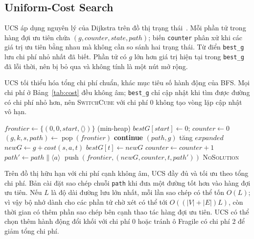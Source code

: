 \subsection{Uniform-Cost Search}

UCS áp dụng nguyên lý của Dijkstra trên đồ thị trạng thái~\cite{dijkstra1959}.
Mỗi phần tử trong hàng đợi ưu tiên chứa $(g,counter,state,path)$; biến
\texttt{counter} phân xử khi các giá trị ưu tiên bằng nhau mà không cần so sánh
hai trạng thái. Từ điển \texttt{best\_g} lưu chi phí nhỏ nhất đã biết. Phần
tử có $g$ lớn hơn giá trị hiện tại trong \texttt{best\_g} đã lỗi thời, nên bị
bỏ qua và không tính là một nút mở rộng.

UCS tối thiểu hóa tổng chi phí chuẩn, khác mục tiêu số hành động của BFS. Mọi chi phí ở
Bảng~\ref{tab:cost} đều không âm; \texttt{best\_g} chỉ cập nhật khi tìm được
đường có chi phí nhỏ hơn, nên \textsc{SwitchCube} với chi phí 0 không tạo vòng
lặp cập nhật vô hạn.

\begin{algorithm}[H]
\caption{Uniform-Cost Search}
\label{alg:ucs}
\begin{algorithmic}[1]
\State $\mathit{frontier}\gets\{(0,0,start,\langle\rangle)\}$ (min-heap)
\State $\mathit{bestG}[start]\gets0$; $\mathit{counter}\gets0$
    \State $(g,k,s,\mathit{path})\gets\operatorname{pop}(\mathit{frontier})$
     \State \textbf{continue} \EndIf
     \State \Return $(\mathit{path},g)$ \EndIf
    \State tăng $expanded$
        \State $\mathit{newG}\gets g+cost(s,a,t)$
            \State $\mathit{bestG}[t]\gets\mathit{newG}$
            \State $\mathit{counter}\gets\mathit{counter}+1$
            \State $\mathit{path}'\gets\mathit{path}\mathbin{\|}\langle a\rangle$
            \State $\operatorname{push}(\mathit{frontier},(\mathit{newG},\mathit{counter},t,\mathit{path}'))$
        \EndIf
    \EndFor
\EndWhile
\State \Return \textsc{NoSolution}
\EndFunction
\end{algorithmic}
\end{algorithm}

Trên đồ thị hữu hạn với chi phí cạnh không âm, UCS đầy đủ và tối ưu theo tổng
chi phí. Bản cài đặt sao chép chuỗi \texttt{path} khi đưa một đường tốt hơn
vào hàng đợi ưu tiên. Nếu $L$ là độ dài đường lưu lớn nhất, mỗi lần sao chép
có thể tốn $O(L)$; vì vậy bộ nhớ dành cho các phần tử chờ xét có thể tới
$O((|V|+|E|)L)$, còn thời gian có thêm phần sao chép bên cạnh thao tác hàng
đợi ưu tiên. UCS có thể chọn thêm hành động đổi khối với chi phí 0 hoặc tránh
ô Fragile có chi phí 2 để giảm tổng chi phí.

